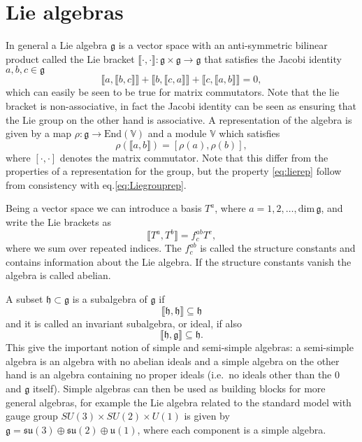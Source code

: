 \section{Lie algebras}\label{sec:Liealgebras}
In general a Lie algebra $\mathfrak{g}$ is a vector space with an anti-symmetric bilinear product called the Lie bracket $\llbracket\cdot,\cdot\rrbracket: \mathfrak{g}\times\mathfrak{g}\to\mathfrak{g}$ that satisfies the Jacobi identity $a,b,c\in\mathfrak{g}$
\begin{equation}
\llbracket a,\llbracket b,c\rrbracket\rrbracket+\llbracket b,\llbracket c,a\rrbracket\rrbracket+\llbracket c,\llbracket a,b\rrbracket\rrbracket=0, 
\end{equation}
which can easily be seen to be true for matrix commutators. Note that the lie bracket is non-associative, in fact the Jacobi identity can be seen as ensuring that the Lie group on the other hand is associative. A representation of the algebra is given by a map $\rho: \mathfrak{g}\to \text{End}(\mathbb{V})$ and a module $\mathbb{V}$ which satisfies
\begin{equation}\label{eq:lierep}
    \rho(\llbracket a,b\rrbracket) = [\rho(a),\rho(b)],
\end{equation}
where $[\cdot,\cdot]$ denotes the matrix commutator. Note that this differ from the properties of a representation for the group, but the property \eqref{eq:lierep} follow from consistency with eq.\eqref{eq:Liegrouprep}.

Being a vector space we can introduce a basis $T^a$, where $a=1,2,\ldots,\text{dim}\,\mathfrak{g}$, and write the Lie brackets as 
\begin{equation}
    \llbracket T^a,T^b\rrbracket = f^{ab}_c T^c,
\end{equation}
where we sum over repeated indices. The $f^{ab}_c$ is called the structure constants and contains information about the Lie algebra. If the structure constants vanish the algebra is called abelian.

A subset $\mathfrak{h}\subset \mathfrak{g}$ is a subalgebra of $\mathfrak{g}$ if \begin{equation}
    \llbracket\mathfrak{h},\mathfrak{h}\rrbracket\subseteq \mathfrak{h}
\end{equation} 
and it is called an invariant subalgebra, or ideal, if also
\begin{equation}
    \llbracket\mathfrak{h},\mathfrak{g}\rrbracket\subseteq \mathfrak{h}.
\end{equation}
This give the important notion of simple and semi-simple algebras: a semi-simple algebra is an algebra with no abelian ideals and a simple algebra on the other hand is an algebra containing no proper ideals (i.e.\ no ideals other than the ${0}$ and $\mathfrak{g}$ itself). Simple algebras can then be used as building blocks for more general algebras, for example the Lie algebra related to the standard model with gauge group $SU(3)\times SU(2)\times U(1)$ is given by $\mathfrak{g}=\mathfrak{su}(3)\oplus\mathfrak{su}(2)\oplus\mathfrak{u}(1)$, where each component is a simple algebra. 

